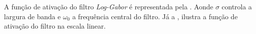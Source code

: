 \par A função de ativação do filtro \textit{Log-Gabor} é representada pela . Aonde $\sigma$ controla a largura de banda e $\omega_{0}$ a frequência central do filtro. Já a , ilustra a função de ativação do filtro na escala linear.





